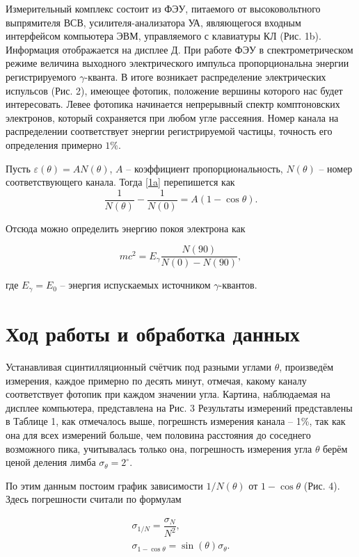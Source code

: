 \documentclass[15pt,a5paper,reqno]{article}
\begin{document}
Измерительный комплекс состоит из ФЭУ, питаемого от высоковольтного выпрямителя ВСВ, усилителя-анализатора УА, являющегося входным интерфейсом компьютера ЭВМ, управляемого с клавиатуры КЛ (Рис. 1b). Информация отображается на дисплее Д. При работе ФЭУ в спектрометрическом режиме величина выходного электрического импульса пропорциональна энергии регистрируемого $\gamma$-кванта. В итоге возникает распределение электрических испульсов (Рис. 2), имеющее фотопик, положение вершины которого нас будет интересовать. Левее фотопика начинается непрерывный спектр комптоновских электронов, который сохраняется при любом угле рассеяния. Номер канала на распределении соответствует энергии регистрируемой частицы, точность его определения примерно $1\%$.


Пусть $\varepsilon(\theta) = AN(\theta)$, $A$ -- коэффициент пропорциональность, $N(\theta)$ -- номер соответствующего канала. Тогда \eqref{1a} перепишется как
\[\tag{1b}\label{1b}
\dfrac{1}{N(\theta)} - \dfrac{1}{N(0)} = A(1-\cos \theta).\]

Отсюда можно определить энергию покоя электрона как 

\begin{equation}
    mc^2 = E_\gamma \dfrac{N(90)}{N(0) - N(90)},
\end{equation}

где $E_\gamma = E_0$ -- энергия испускаемых источником $\gamma$-квантов.

\section{Ход работы и обработка данных}

Устанавливая сцинтилляционный счётчик под разными углами $\theta$, произведём измерения, каждое примерно по десять минут, отмечая, какому каналу соответствует фотопик при каждом значении угла. Картина, наблюдаемая на дисплее компьютера, представлена на Рис. 3
Результаты измерений представлены в Таблице 1, как отмечалось выше, погрешнсть измерения канала -- 1\%, так как она для всех измерений больше, чем половина расстояния до соседнего возможного пика, учитывалась только она, погрешность измерения угла $\theta$ берём ценой деления лимба $\sigma_\theta = 2^\circ$.



По этим данным постоим график зависимости $1/N(\theta)$ от $1-\cos \theta$ (Рис. 4). Здесь погрешности считали по формулам

\[\begin{array}{l}
\sigma_{1/N} = \dfrac{\sigma_N}{N^2},\\
\sigma_{1-\cos \theta} = \sin(\theta) \sigma_\theta.\\
\end{array}\]
\end{document}
